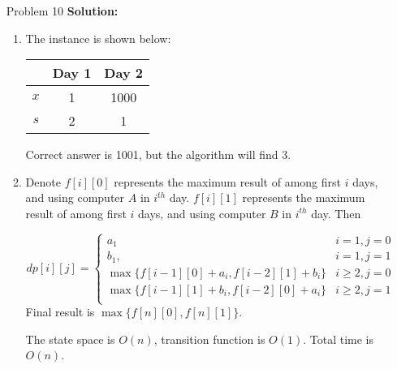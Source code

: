 \normalfont\documentclass[letterpaper,11pt]{article}
\begin{document}
\begin{enumerate}
\begin{enumerate}
\end{enumerate}
\item [Problem 10]\textbf{Solution:}\par
\begin{enumerate}
	\item The instance is shown below:\par
	\begin{tabular}{ccc}
			\hline
			& Day 1& Day 2 \\
			\hline
			$x$ & 1 & 1000 \\
			\hline
			$s$ & 2 & 1 \\
			\hline
	\end{tabular}\par
	Correct answer is 1001, but the algorithm will find 3.
	\item Denote $f[i][0]$ represents the maximum result of among first $i$ days, and using computer $A$ in $i^{th}$ day. $f[i][1]$ represents the maximum result of among first $i$ days, and using computer $B$ in $i^{th}$ day. Then 

	$$ dp[i][j]=\left\{
		\begin{array}{ll}
		a_1 & i = 1, j = 0\\
		b_1,& i = 1, j = 1\\
		\max  \{f[i-1][0] + a_i, f[i-2][1] + b_i\} & i \ge 2, j = 0\\
		\max  \{f[i-1][1] + b_i, f[i-2][0] + a_i\} & i \ge 2, j = 1\\
		\end{array} \right. 
	$$
	Final result is $\max \{f[n][0],f[n][1]\}$.\par
	The state space is $O(n)$, transition function is $O(1)$. Total time is $O(n)$.
	\end{enumerate}
\end{enumerate}
\end{document}
